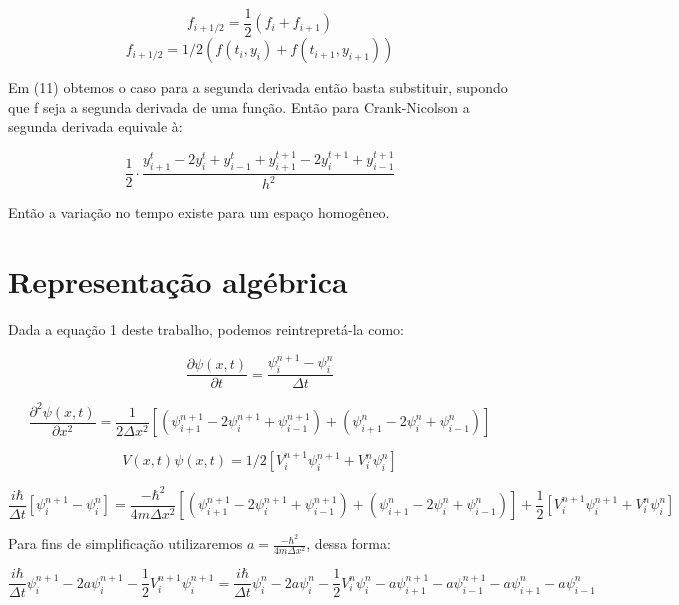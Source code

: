 \documentclass[linenumbers]{aastex631}
\begin{document}
$$f_{i+1/2}=\frac{1}{2}(f_i+f_{i+1})$$
$$f_{i+1/2}=1/2(f(t_i,y_i)+f(t_{i+1},y_{i+1}))$$

Em (11) obtemos o caso para a segunda derivada então basta substituir, supondo que f seja a segunda derivada de uma função. Então para Crank-Nicolson a segunda derivada equivale à:

\begin{equation}
    \frac{1}{2}\cdot\frac{y^t_{i+1}-2y^t_i+y^t_{i-1}+y^{t+1}_{i+1}-2y^{t+1}_i+y^{t+1}_{i-1}}{h^2}
\end{equation}

Então a variação no tempo existe para um espaço homogêneo.

\section{Representação algébrica}

Dada a equação 1 deste trabalho, podemos reintrepretá-la como:

\begin{equation}
    \frac{\partial\psi(x,t)}{\partial t} = \frac{\psi^{n+1}_i - \psi^n_i}{\Delta t}
\end{equation}

\begin{equation}
    \frac{\partial^2\psi(x,t)}{\partial x^2} = \frac{1}{2\Delta x^2}[(\psi^{n+1}_{i+1} - 2\psi^{n+1}_{i}+\psi^{n+1}_{i-1})+(\psi^{n}_{i+1} - 2\psi^{n}_{i}+\psi^{n}_{i-1})]
\end{equation}

\begin{equation}
    V(x,t)\psi(x,t)=1/2[V^{n+1}_i\psi^{n+1}_i+V^{n}_i\psi^{n}_i]
\end{equation}

\begin{equation}
    \frac{i\hbar}{\Delta t}[\psi^{n+1}_i - \psi^n_i]=\frac{-\hbar^2}{4m\Delta x^2}[(\psi^{n+1}_{i+1} - 2\psi^{n+1}_{i}+\psi^{n+1}_{i-1})+(\psi^{n}_{i+1} - 2\psi^{n}_{i}+\psi^{n}_{i-1})]+\frac{1}{2}[V^{n+1}_i\psi^{n+1}_i+V^{n}_i\psi^{n}_i]
\end{equation}

Para fins de simplificação utilizaremos $a = \frac{-\hbar^2}{4m\Delta x^2}$, dessa forma:

$$\frac{i\hbar}{\Delta t}\psi^{n+1}_i-2a\psi^{n+1}_i-\frac{1}{2}V^{n+1}_i\psi^{n+1}_i = \frac{i\hbar}{\Delta t}\psi^{n}_i-2a\psi^{n}_i-\frac{1}{2}V^{n}_i\psi^{n}_i-a\psi^{n+1}_{i+1}-a\psi^{n+1}_{i-1}-a\psi^{n}_{i+1}-a\psi^{n}_{i-1}$$
\end{document}
